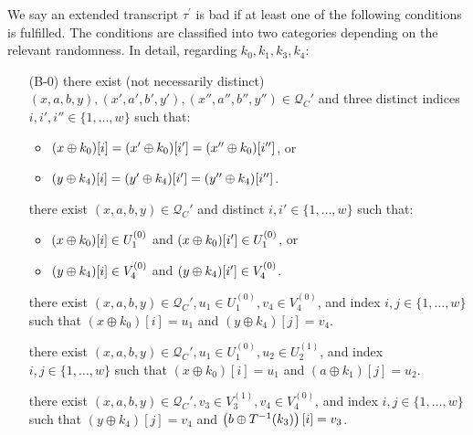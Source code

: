 \begin{definition}
\label{defn:bad-tau-4-rounds}

We say an extended transcript $\tau^{\prime}$ is bad if at least one of the following conditions is fulfilled. The conditions are classified into two categories depending on the relevant randomness. In detail, regarding $k_0,k_1,k_3,k_4$:
\begin{itemize}[leftmargin=10mm]
	\item[(B-0)] there exist (not necessarily distinct) $(x,a,b,y),(x',a',b',y'),(x'',a'',b'',y'')\in \mathcal{Q}_{C}'$ and three distinct indices $i, i', i'' \in \{1, \ldots, w\}$ such that:
	\begin{itemize}
		\item $(x\oplus k_0)[i]=(x'\oplus k_0)[i']=(x''\oplus k_0)[i'']$, or
		\item $(y\oplus k_4)[i]=(y'\oplus k_4)[i']=(y''\oplus k_4)[i'']$.
	\end{itemize}
	\item[\bone] there exist $(x,a,b,y) \in \mathcal{Q}_{C}'$ and distinct $i, i' \in \{1, \ldots, w\}$ such that:
	\begin{itemize}
		\item $(x\oplus k_0)[i]\in U_1^{(0)}$ and $(x\oplus k_0)[i']\in U_1^{(0)}$, or
		\item $(y\oplus k_4)[i]\in V_4^{(0)}$ and $(y\oplus k_4)[i']\in V_4^{(0)}$.
	\end{itemize}
	\item[\btwo] there exist $(x,a,b,y) \in \mathcal{Q}_{C}', u_1 \in U_1^{(0)}, v_4 \in V_4^{(0)}$, and index $i, j \in \{1, \ldots, w\}$ such that $\left(x \oplus k_{0}\right)[i]=u_1$ and $\left(y \oplus k_{4}\right)[j]=v_4$.
	\item[\bthree] there exist $(x,a,b,y) \in \mathcal{Q}_{C}', u_1 \in U_1^{(0)}, u_2\in U_2^{(1)}$, and index $i, j \in \{1, \ldots, w\}$ such that $\left(x \oplus k_{0}\right)[i]=u_1$ and $\left(a\oplus k_{1}\right)[j]=u_2$.
	\item[\bfour] there exist $(x,a,b,y) \in \mathcal{Q}_{C}', v_{3}\in V_3^{(1)}, v_{4}\in V_4^{(0)}$, and index $i, j \in \{1, \ldots, w\}$ such that $\left(y \oplus k_{4}\right)[j]=v_4$ and $\left(b\oplus T^{-1}(k_3)\right) [i]=v_3$.

\end{itemize}
\end{definition}
